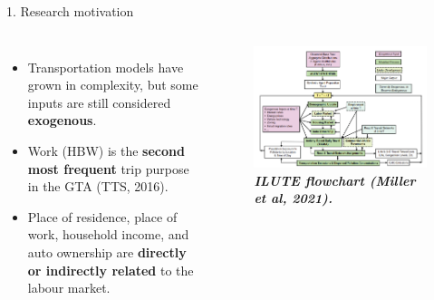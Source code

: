 \documentclass[aspectratio=169]{beamer}
\begin{document}
\begin{frame}{1. Research motivation}
    \vspace*{-25pt}
    \begin{columns}
            \begin{itemize}
                \setlength{\itemsep}{10pt} %
                \item \fontsize{9pt}{9pt}\selectfont Transportation models have grown in complexity, but some inputs are still considered \textbf{exogenous}.
                \item \fontsize{9pt}{9pt}\selectfont Work (HBW) is the \textbf{second most frequent} trip purpose in the GTA (TTS, 2016).
                \item \fontsize{9pt}{9pt}\selectfont Place of residence, place of work, household income, and auto ownership are \textbf{directly or indirectly related} to the labour market.
            \end{itemize}
            \begin{figure}
                \centering
                \includegraphics[width=1.0\textwidth]{./images/ilute.png}
                \captionsetup{labelformat=empty}
                \caption{\fontsize{8pt}{8pt}\selectfont \textbf{\textit{ILUTE flowchart (Miller et al, 2021).}}}
            \end{figure}
    \end{columns}
\end{frame}  
\end{document}
